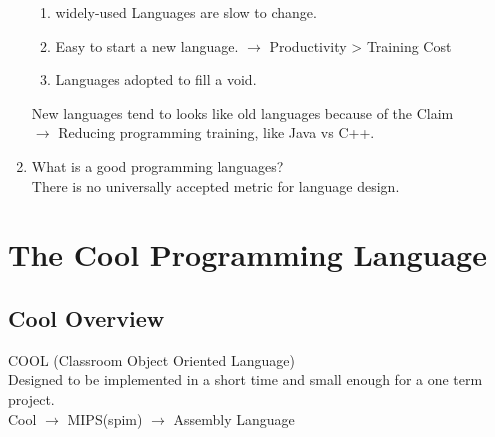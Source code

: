 \documentclass[11pt]{report}
\begin{document}
\begin{enumerate}
        \begin{enumerate}
            \item widely-used Languages are slow to change.
            \item Easy to start a new language. \(\longrightarrow\) Productivity > Training Cost
            \item Languages adopted to fill a void.
        \end{enumerate}
        \begin{flushleft}
            New languages tend to looks like old languages because of the Claim\\
            \(\rightarrow\) Reducing programming training, like Java vs C++.
        \end{flushleft}
        \item What is a good programming languages?\\
        \textcolor{stanfordred}{There is no universally accepted metric for language design. }
    \end{enumerate}

    \newpage
    \chapter{The Cool Programming Language}
    \section{Cool Overview}
    \textcolor{stanfordred}{COOL} (Classroom Object Oriented Language) \\
    Designed to be implemented in a short time and small enough for a one term project. \\
    Cool \(\longrightarrow\) MIPS(spim) \(\longrightarrow\) Assembly Language
\end{document}
